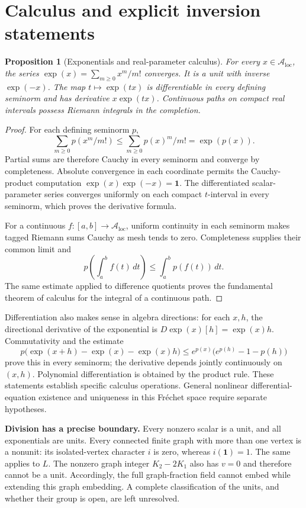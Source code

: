 \documentclass[11pt]{article}
\newtheorem{proposition}[theorem]{Proposition}
\theoremstyle{definition}\newtheorem{definition}[theorem]{Definition}
\newcommand{\A}{\mathcal A}
\newcommand{\one}{\mathbf 1}
\begin{document}
\section{Calculus and explicit inversion statements}

\begin{proposition}[Exponentials and real-parameter calculus]
For every $x\in\A_{\mathrm{loc}}$, the series $\exp(x)=\sum_{m\ge0}x^m/m!$ converges. It is a unit with inverse $\exp(-x)$. The map $t\mapsto\exp(tx)$ is differentiable in every defining seminorm and has derivative $x\exp(tx)$. Continuous paths on compact real intervals possess Riemann integrals in the completion.
\end{proposition}
\begin{proof}
For each defining seminorm $p$,
\[
 \sum_{m\ge0}p(x^m/m!)\le\sum_{m\ge0}p(x)^m/m!=\exp(p(x)).
\]
Partial sums are therefore Cauchy in every seminorm and converge by completeness. Absolute convergence in each coordinate permits the Cauchy-product computation $\exp(x)\exp(-x)=\one$. The differentiated scalar-parameter series converges uniformly on each compact $t$-interval in every seminorm, which proves the derivative formula.

For a continuous $f:[a,b]\to\A_{\mathrm{loc}}$, uniform continuity in each seminorm makes tagged Riemann sums Cauchy as mesh tends to zero. Completeness supplies their common limit and
\[
 p\left(\int_a^bf(t)\,dt\right)\le\int_a^bp(f(t))\,dt.
\]
The same estimate applied to difference quotients proves the fundamental theorem of calculus for the integral of a continuous path.
\end{proof}

Differentiation also makes sense in algebra directions: for each $x,h$, the directional derivative of the exponential is $D\exp(x)[h]=\exp(x)h$. Commutativity and the estimate
\[
 p\bigl(\exp(x+h)-\exp(x)-\exp(x)h\bigr)
 \le e^{p(x)}\bigl(e^{p(h)}-1-p(h)\bigr)
\]
prove this in every seminorm; the derivative depends jointly continuously on $(x,h)$. Polynomial differentiation is obtained by the product rule. These statements establish specific calculus operations. General nonlinear differential-equation existence and uniqueness in this Fr\'echet space require separate hypotheses.

\textbf{Division has a precise boundary.} Every nonzero scalar is a unit, and all exponentials are units. Every connected finite graph with more than one vertex is a nonunit: its isolated-vertex character $i$ is zero, whereas $i(\one)=1$. The same applies to $L$. The nonzero graph integer $K_2-2K_1$ also has $v=0$ and therefore cannot be a unit. Accordingly, the full graph-fraction field cannot embed while extending this graph embedding. A complete classification of the units, and whether their group is open, are left unresolved.
\end{document}
